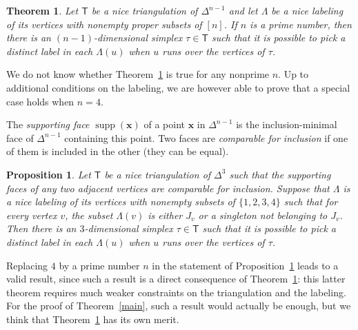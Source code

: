 \documentclass[12pt]{amsart}
\newtheorem{theorem}{Theorem} %
\newtheorem{proposition}{Proposition}
\theoremstyle{definition}
\theoremstyle{remark}
\def\T{\mathsf{T}}
\def\xx{\boldsymbol{x}}
\def\supp{\operatorname{supp}}
\def\supp{\operatorname{supp}}
\def\blue{\color{blue}}
\begin{document}

\begin{theorem}\label{thm:sperner-symmetry-prime}
Let $\T$ be a nice triangulation of $\Delta^{n-1}$ and let $\Lambda$ be a nice labeling of its vertices with nonempty proper subsets of $[n]$. If $n$ is a prime number, then there is an $(n-1)$-dimensional simplex $\tau\in\T$ such that it is possible to pick a distinct label in each $\Lambda(u)$ when $u$ runs over the vertices of $\tau$.
\end{theorem}

 We do not know whether Theorem~\ref{thm:sperner-symmetry-prime} is true for any nonprime $n$. Up to additional conditions on the labeling, we are however able to prove that a special case holds when $n=4$.

The {\em supporting face} $\supp(\xx)$ of a point $\xx$ in $\Delta^{n-1}$ is the inclusion-minimal face of $\Delta^{n-1}$ containing this point. Two faces are {\em comparable for inclusion} if one of them is included in the other (they can be equal).

\begin{proposition}\label{prop:sperner-symmetry-4}
Let $\T$ be a nice triangulation of $\Delta^{3}$ such that the supporting faces of any two adjacent vertices are comparable for inclusion. Suppose that $\Lambda$ is a nice labeling of its vertices with nonempty subsets of $\{1,2,3,4\}$ such that for every vertex $v$, the subset $\Lambda(v)$ is either $J_v$ or a singleton not belonging to $J_v$. Then there is an $3$-dimensional simplex $\tau\in\T$ such that it is possible to pick a distinct label in each $\Lambda(u)$ when $u$ runs over the vertices of $\tau$.
\end{proposition}

Replacing $4$ by a prime number $n$ in the statement of Proposition~\ref{prop:sperner-symmetry-4} leads to a valid result, since such a result is a direct consequence of Theorem~\ref{thm:sperner-symmetry-prime}: this latter theorem requires much weaker constraints on the triangulation and the labeling. For the proof of Theorem~\ref{main}, such a result would actually be enough, but we think that Theorem~\ref{thm:sperner-symmetry-prime} has its own merit.


\end{document}
